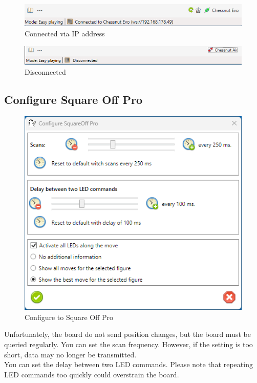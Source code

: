 \documentclass[11pt,a4paper]{article}
\begin{document}
\begin{figure}[H]
	\centering
	\includegraphics[scale=0.7]{ChessnutEvo6.png}
	\caption{Connected via IP address}
	\label{fig:ChessnutEvo2}
\end{figure}


\begin{figure}[H]
	\centering
	\includegraphics[scale=0.7]{ChessnutAir3.png}
	\caption{Disconnected}
	\label{fig:ChessnutEvo3}
\end{figure}


\subsection{Configure Square Off Pro} \label{ConfigureSquareOff}
\begin{figure}[H]
	\centering
	\includegraphics[scale=1.0]{SquareOffPro0.png}
	\caption{Configure to Square Off Pro }
	\label{fig:SquareOffPro0}
\end{figure}

Unfortunately, the board do not send position changes, but the board must be queried regularly.
You can set the scan frequency. However, if the setting is too short, data may no longer be transmitted.\\
You can set the delay between two LED commands. Please note that repeating LED commands too quickly could overstrain the board.\\
\end{document}
